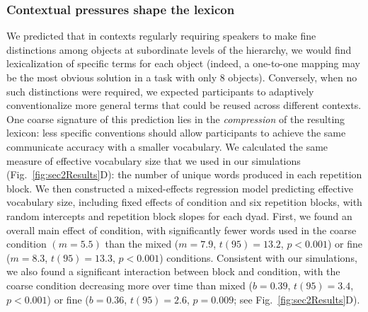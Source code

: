 

\subsubsection{Contextual pressures shape the lexicon}

We predicted that in contexts regularly requiring speakers to make fine distinctions among objects at subordinate levels of the hierarchy, we would find lexicalization of specific terms for each object (indeed, a one-to-one mapping may be the most obvious solution in a task with only 8 objects). 
Conversely, when no such distinctions were required, we expected participants to adaptively conventionalize more general terms that could be reused across different contexts.
One coarse signature of this prediction lies in the \emph{compression} of the resulting lexicon: less specific conventions should allow participants to achieve the same communicate accuracy with a smaller vocabulary.
We calculated the same measure of effective vocabulary size that we used in our simulations (Fig.~\ref{fig:sec2Results}D): the number of unique words produced in each repetition block. 
We then constructed a mixed-effects regression model predicting effective vocabulary size, including fixed effects of condition and six repetition blocks, with random intercepts and repetition block slopes for each dyad. 
First, we found an overall main effect of condition, with significantly fewer words used in the coarse condition $(m = 5.5)$ than the mixed ($m=7.9$, $t(95)=13.2$, $p <0.001$) or fine ($m=8.3$, $t(95) =13.3$, $p < 0.001$) conditions.
Consistent with our simulations, we also found a significant interaction between block and condition, with the coarse condition decreasing more over time than mixed ($b = 0.39$, $t(95) = 3.4$, $p < 0.001$) or fine ($b=0.36$, $t(95)=2.6$, $p=0.009$; see Fig.~\ref{fig:sec2Results}D).


